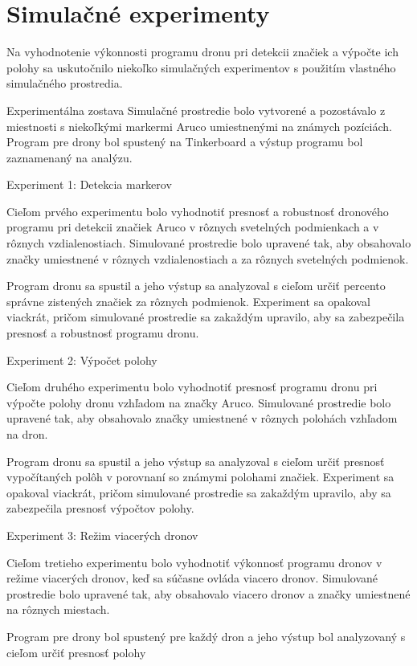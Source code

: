 \section{Simulačné experimenty}
Na vyhodnotenie výkonnosti programu dronu pri detekcii značiek a výpočte ich polohy sa uskutočnilo niekoľko simulačných experimentov s použitím vlastného simulačného prostredia.

Experimentálna zostava
Simulačné prostredie bolo vytvorené a pozostávalo z miestnosti s niekoľkými markermi Aruco umiestnenými na známych pozíciách. Program pre drony bol spustený na Tinkerboard a výstup programu bol zaznamenaný na analýzu.

Experiment 1: Detekcia markerov

Cieľom prvého experimentu bolo vyhodnotiť presnosť a robustnosť dronového programu pri detekcii značiek Aruco v rôznych svetelných podmienkach a v rôznych vzdialenostiach. Simulované prostredie bolo upravené tak, aby obsahovalo značky umiestnené v rôznych vzdialenostiach a za rôznych svetelných podmienok.

Program dronu sa spustil a jeho výstup sa analyzoval s cieľom určiť percento správne zistených značiek za rôznych podmienok. Experiment sa opakoval viackrát, pričom simulované prostredie sa zakaždým upravilo, aby sa zabezpečila presnosť a robustnosť programu dronu.

Experiment 2: Výpočet polohy

Cieľom druhého experimentu bolo vyhodnotiť presnosť programu dronu pri výpočte polohy dronu vzhľadom na značky Aruco. Simulované prostredie bolo upravené tak, aby obsahovalo značky umiestnené v rôznych polohách vzhľadom na dron.

Program dronu sa spustil a jeho výstup sa analyzoval s cieľom určiť presnosť vypočítaných polôh v porovnaní so známymi polohami značiek. Experiment sa opakoval viackrát, pričom simulované prostredie sa zakaždým upravilo, aby sa zabezpečila presnosť výpočtov polohy.

Experiment 3: Režim viacerých dronov

Cieľom tretieho experimentu bolo vyhodnotiť výkonnosť programu dronov v režime viacerých dronov, keď sa súčasne ovláda viacero dronov. Simulované prostredie bolo upravené tak, aby obsahovalo viacero dronov a značky umiestnené na rôznych miestach.

Program pre drony bol spustený pre každý dron a jeho výstup bol analyzovaný s cieľom určiť presnosť polohy

